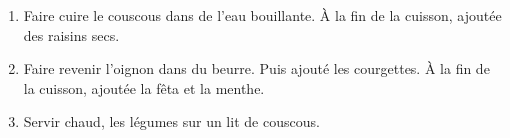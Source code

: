 
\begin{ingredients}

\end{ingredients}


\begin{recipe}
  \begin{enumerate}

  \item Faire cuire le couscous dans de l'eau bouillante.  À la fin de
    la cuisson, ajoutée des raisins secs.

  \item Faire revenir l'oignon dans du beurre.  Puis ajouté les
    courgettes.  À la fin de la cuisson, ajoutée la fêta et la
    menthe.

  \item Servir chaud, les légumes sur un lit de couscous.

  \end{enumerate}
\end{recipe}

